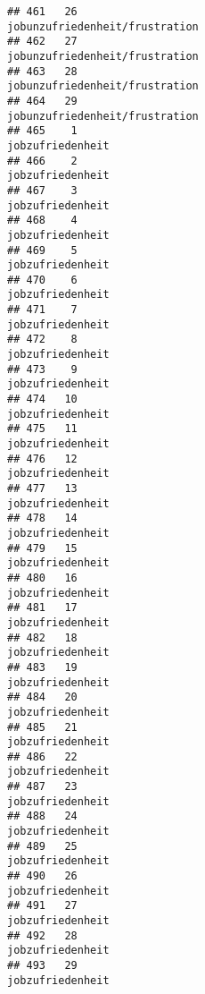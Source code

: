 \documentclass[
]{article}
\begin{document}
\begin{verbatim}
## 461   26                                     jobunzufriedenheit/frustration 
## 462   27                                     jobunzufriedenheit/frustration 
## 463   28                                     jobunzufriedenheit/frustration 
## 464   29                                     jobunzufriedenheit/frustration 
## 465    1                                                    jobzufriedenheit
## 466    2                                                    jobzufriedenheit
## 467    3                                                    jobzufriedenheit
## 468    4                                                    jobzufriedenheit
## 469    5                                                    jobzufriedenheit
## 470    6                                                    jobzufriedenheit
## 471    7                                                    jobzufriedenheit
## 472    8                                                    jobzufriedenheit
## 473    9                                                    jobzufriedenheit
## 474   10                                                    jobzufriedenheit
## 475   11                                                    jobzufriedenheit
## 476   12                                                    jobzufriedenheit
## 477   13                                                    jobzufriedenheit
## 478   14                                                    jobzufriedenheit
## 479   15                                                    jobzufriedenheit
## 480   16                                                    jobzufriedenheit
## 481   17                                                    jobzufriedenheit
## 482   18                                                    jobzufriedenheit
## 483   19                                                    jobzufriedenheit
## 484   20                                                    jobzufriedenheit
## 485   21                                                    jobzufriedenheit
## 486   22                                                    jobzufriedenheit
## 487   23                                                    jobzufriedenheit
## 488   24                                                    jobzufriedenheit
## 489   25                                                    jobzufriedenheit
## 490   26                                                    jobzufriedenheit
## 491   27                                                    jobzufriedenheit
## 492   28                                                    jobzufriedenheit
## 493   29                                                    jobzufriedenheit

\end{verbatim}
\end{document}
